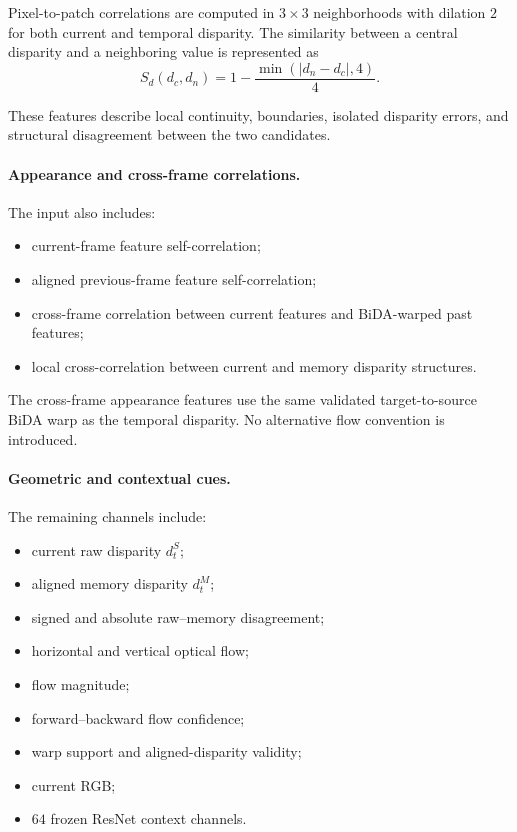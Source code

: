 \documentclass[11pt,a4paper]{article}
\begin{document}
Pixel-to-patch correlations are computed in \(3\times3\) neighborhoods with dilation \(2\)
for both current and temporal disparity. The similarity between a central disparity and a
neighboring value is represented as
\begin{equation}
    S_d(d_c,d_n)
    =
    1-
    \frac{
        \min\left(
            |d_n-d_c|,
            4
        \right)
    }{4}.
    \label{eq:disparity_similarity}
\end{equation}

These features describe local continuity, boundaries, isolated disparity errors, and
structural disagreement between the two candidates.

\paragraph{Appearance and cross-frame correlations.}

The input also includes:

\begin{itemize}
    \item current-frame feature self-correlation;
    \item aligned previous-frame feature self-correlation;
    \item cross-frame correlation between current features and BiDA-warped past features;
    \item local cross-correlation between current and memory disparity structures.
\end{itemize}

The cross-frame appearance features use the same validated target-to-source BiDA warp as
the temporal disparity. No alternative flow convention is introduced.

\paragraph{Geometric and contextual cues.}

The remaining channels include:

\begin{itemize}
    \item current raw disparity \(d_t^{S}\);
    \item aligned memory disparity \(d_t^{M}\);
    \item signed and absolute raw--memory disagreement;
    \item horizontal and vertical optical flow;
    \item flow magnitude;
    \item forward--backward flow confidence;
    \item warp support and aligned-disparity validity;
    \item current RGB;
    \item \(64\) frozen ResNet context channels.
\end{itemize}
\end{document}
